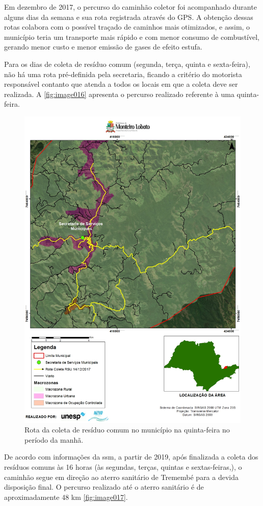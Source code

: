 	Em dezembro de 2017, o percurso do caminhão coletor foi acompanhado durante alguns dias da semana e sua rota registrada através do GPS. A obtenção dessas rotas colabora com o possível traçado de caminhos mais otimizados, e assim, o município teria um transporte mais rápido e com menor consumo de combustível, gerando menor custo e menor emissão de gases de efeito estufa.
	
	Para os dias de coleta de resíduo comum (segunda, terça, quinta e sexta-feira), não há uma rota pré-definida pela secretaria, ficando a critério do motorista responsável contanto que atenda a todos os locais em que a coleta deve ser realizada. A \autoref{fig:image016} apresenta o percurso realizado referente à uma quinta-feira.
	
	\begin{figure}
		\centering
		\includegraphics[width=0.75\linewidth]{produtos/prodtres/image016}
		\caption{Rota da coleta de resíduo comum no município na quinta-feira no período da manhã.}
		\label{fig:image016}
	\end{figure}
	
	De acordo com informações da \gls{ssm}, a partir de 2019, após finalizada a coleta dos resíduos comuns às 16 horas (às segundas, terças, quintas e sextas-feiras,), o caminhão segue em direção ao aterro sanitário de Tremembé para a devida disposição final. O percurso realizado até o aterro sanitário é de aproximadamente 48 km \autoref{fig:image017}.
	
